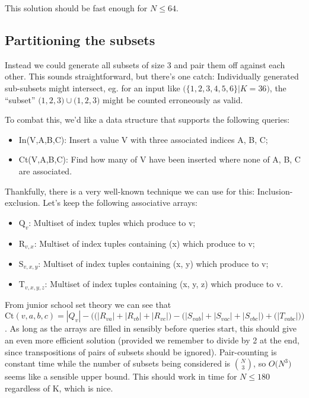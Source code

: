 This solution should be fast enough for $ N \le 64 $.

\subsection {Partitioning the subsets}

Instead we could generate all subsets of size 3 and pair them off against each other. This sounds straightforward, but
there's one catch: Individually generated sub-subsets might intersect, eg. for an input like $ \Big(\Big\{1,2,3,4,5,6\Big\} | K = 36 \Big) $, the ``subset''
$ \big( 1,2,3 \big) \cup \big( 1,2,3 \big) $ might be counted erroneously as valid.

To combat this, we'd like a data structure that supports the following queries:
\begin{itemize}
  \item In(V,A,B,C): Insert a value V with three associated indices A, B, C;
  \item Ct(V,A,B,C): Find how many of V have been inserted where none of A, B, C are associated.
\end{itemize}

Thankfully, there is a very well-known technique we can use for this: Inclusion-exclusion. Let's keep the following associative
arrays:
\begin{itemize}
  \item $ \textrm{Q}_{v} $: Multiset of index tuples which produce to v;
  \item $ \textrm{R}_{v, x} $: Multiset of index tuples containing (x) which produce to v;
  \item $ \textrm{S}_{v, x, y} $: Multiset of index tuples containing (x, y) which produce to v;
  \item $ \textrm{T}_{v, x, y, z} $: Multiset of index tuples containing (x, y, z) which produce to v.
\end{itemize}

From junior school set theory we can see that
$ \textrm{Ct}(v,a,b,c) = |Q_v| - \Big( \big( |R_{va}| + |R_{vb}| + |R_{vc}| \big) - \big( |S_{vab}| + |S_{vac}| + |S_{vbc}| \big) + \big( |T_{vabc}| \big) \Big) $.
As long as the arrays are filled in sensibly before queries start, this should give an even more efficient solution (provided
we remember to divide by 2 at the end, since transpositions of pairs of subsets should be ignored). Pair-counting is constant time
while the number of subsets being considered is $ N \choose 3 $, so $ O \big( N^3 \big) $ seems like a sensible upper bound.
This should work in time for $ N \le 180 $ regardless of K, which is nice.


